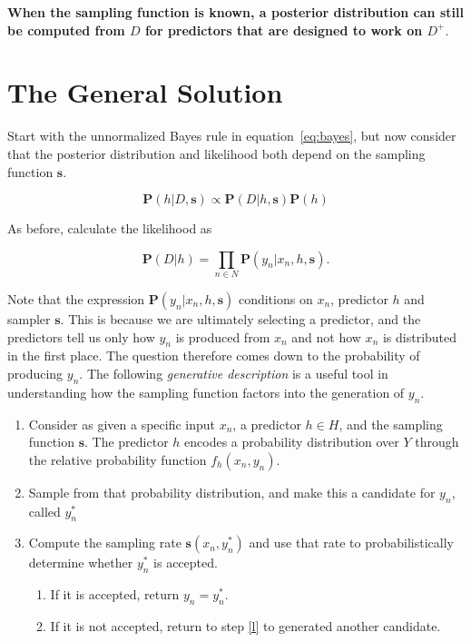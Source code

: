 \documentclass[twoside]{article}
\begin{document}
\textbf{When the sampling function is known, a posterior distribution can still be computed from \(D\) for predictors that are designed to work on \(D^+\)}.

\section{The General Solution}
\label{section:solution}

Start with the unnormalized Bayes rule in equation~\eqref{eq:bayes}, but now consider that the posterior distribution and likelihood both depend on the sampling function \(\mathbf{s}\).

\[\mathbf{P}(h|D,\mathbf{s})\propto\mathbf{P}(D|h,\mathbf{s})\mathbf{P}(h)\]

As before, calculate the likelihood as

\[\mathbf{P}(D|h)=\prod_{n \in N} \mathbf{P}(y_n|x_n,h,\mathbf{s}).\]

Note that the expression \(\mathbf{P}(y_n|x_n,h,\mathbf{s})\) conditions on \(x_n\), predictor \(h\) and sampler \(\mathbf{s}\). This is because we are ultimately selecting a predictor, and the predictors tell us only how \(y_n\) is produced from \(x_n\) and not how \(x_n\) is distributed in the first place. The question therefore comes down to the probability of producing \(y_n\). The following \textit{generative description} is a useful tool in understanding how the sampling function factors into the generation of \(y_n\).

\begin{enumerate}
	\item Consider as given a specific input \(x_n\), a predictor \(h \in H\), and the sampling function \(\mathbf{s}\). The predictor \(h\) encodes a probability distribution over \(Y\) through the relative probability function \(f_h(x_n,y_n)\).
	\item \label{l} Sample from that probability distribution, and make this a candidate for \(y_n\), called \(y_n^*\)
	\item Compute the sampling rate \(\mathbf{s}(x_n,y_n^*)\) and use that rate to probabilistically determine whether \(y_n^*\) is accepted.
    \begin{enumerate}
        \item If it is accepted, return \(y_n=y_n^*\).
        \item If it is not accepted, return to step \ref{l} to generated another candidate.
    \end{enumerate}
\end{enumerate}
\end{document}
